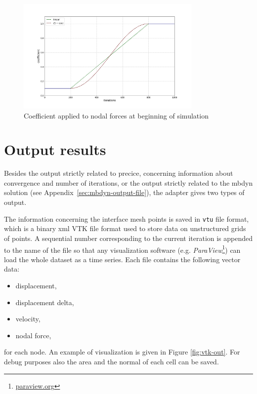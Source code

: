 \begin{figure}[htbp!]
	\centering
	\includegraphics[width=0.8\textwidth]{images/coeff.png}
	\caption{Coefficient applied to nodal forces at beginning of simulation}
	\label{fig:sim-coeff}
\end{figure}


\section{Output results}
\label{sec:mbdyn-adapter-output}

Besides the output strictly related to \acrshort{precice}, concerning information about convergence and number of iterations, or the output strictly related to the \acrshort{mbdyn} solution (see Appendix~\ref{sec:mbdyn-output-file}), the adapter gives two types of output.

The information concerning the interface mesh points is saved in \texttt{vtu} file format, which is a binary \acrshort{xml} VTK  file format used to store data on unstructured grids of points. A sequential number corresponding to the current iteration is appended to the name of the file so that any visualization software (e.g. \textit{ParaView}\footnote{\href{https://www.paraview.org/}{paraview.org}}) can load the whole dataset as a time series. Each file contains the following vector data:

\begin{itemize}
    \item displacement,
    \item displacement delta,
    \item velocity,
    \item nodal force,
\end{itemize}

for each node. An example of visualization is given in Figure \ref{fig:vtk-out}. For debug purposes also the area and the normal of each cell can be saved. 

